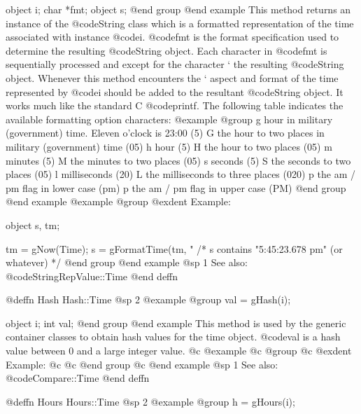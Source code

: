 object  i;
char    *fmt;
object  s;
@end group
@end example
This method returns an instance of the @code{String} class which is a
formatted representation of the time associated with instance @code{i}.
@code{fmt} is the format specification used to determine the resulting
@code{String} object.  Each character in @code{fmt} is sequentially
processed and except for the character `%
the resulting @code{String} object.  Whenever this method encounters
the `%
aspect and format of the time represented by @code{i} should be added to
the resultant @code{String} object.  It works much like the standard C
@code{printf}.  The following table indicates the available formatting option
characters:
@example
@group
g       hour in military (government) time.
        Eleven o'clock is 23:00 (5)
G       the hour to two places in military (government)
        time (05)
h       hour (5)
H       the hour to two places (05)
m       minutes (5)
M       the minutes to two places (05)
s       seconds (5)
S       the seconds to two places (05)
l       milliseconds (20)
L       the milliseconds to three places (020)
p       the am / pm flag in lower case (pm)
p       the am / pm flag in upper case (PM)
@end group
@end example
@example
@group
@exdent Example:

object  s, tm;

tm = gNow(Time);
s = gFormatTime(tm, "%
/*  s contains "5:45:23.678 pm" (or whatever)  */
@end group
@end example
@sp 1
See also:  @code{StringRepValue::Time}
@end deffn










@deffn {Hash} Hash::Time
@sp 2
@example
@group
val = gHash(i);

object  i;
int     val;
@end group
@end example
This method is used by the generic container classes to obtain hash values
for the time object.  @code{val} is a hash value between 0 and a large
integer value.
@c @example
@c @group
@c @exdent Example:
@c
@c @end group
@c @end example
@sp 1
See also:  @code{Compare::Time}
@end deffn











@deffn {Hours} Hours::Time
@sp 2
@example
@group
h = gHours(i);

